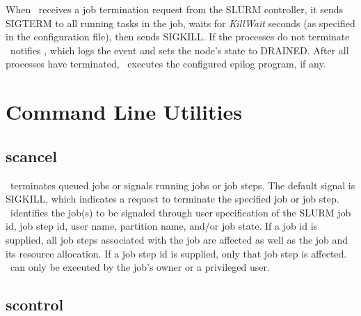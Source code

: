 \documentclass[10pt,onecolumn,times]{../common/llncs}
\begin{document}
{When \slurmd\ receives a job termination request from the SLURM
controller, it sends SIGTERM to all running tasks in the job,
waits for {\em KillWait} seconds (as specified in the configuration
file), then sends SIGKILL. If the processes do not terminate \slurmd\
notifies \slurmctld , which logs the event and sets the node's state
to DRAINED. After all processes have terminated, \slurmd\ executes the
configured epilog program, if any.

\section{Command Line Utilities}

\subsection{scancel}

\scancel\ terminates queued jobs or signals running jobs or job steps.
The default signal is SIGKILL, which indicates a request to terminate
the specified job or job step.  \scancel\ identifies the job(s) to
be signaled through user specification of the SLURM job id, job step id,
user name, partition name, and/or job state.  If a job id is supplied,
all job steps associated with the job are affected as well as the job
and its resource allocation.  If a job step id is supplied, only that
job step is affected.  \scancel\ can only be executed by the job's owner
or a privileged user.

\subsection{scontrol}

}
\end{document}
